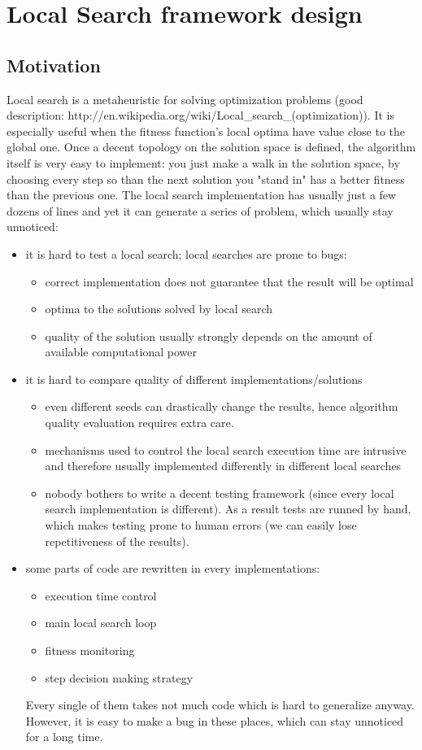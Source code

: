 \chapter{Local Search framework design}

\section{Motivation}

Local search is a metaheuristic for solving optimization problems (good description: http://en.wikipedia.org/wiki/Local\_search\_(optimization)).
It is especially useful when the fitness function's local optima have value close to the global one.
Once a decent topology on the solution space is defined, the algorithm itself is very easy to implement:
you just make a walk in the solution space, by choosing every step so than the next solution you "stand in" has
a better fitness than the previous one. The local search implementation has usually just a few dozens of lines and
yet it can generate a series of problem, which usually stay unnoticed:
\begin{itemize}
\item it is hard to test a local search; local searches are prone to bugs:
	\begin{itemize}
	\item correct implementation does not guarantee that the result will be optimal
	\item optima to the solutions solved by local search
	\item quality of the solution usually strongly depends on the amount of available computational power
	\end{itemize}
\item it is hard to compare quality of different implementations/solutions
	\begin{itemize}
	\item even different seeds can drastically change the results, hence algorithm quality evaluation requires extra care.
	\item mechanisms used to control the local search execution time are intrusive and therefore usually implemented differently in different local searches
	\item nobody bothers to write a decent testing framework (since every local search implementation is different).
		As a result tests are runned by hand, which makes testing prone to human errors (we can easily lose repetitiveness of the results).
	\end{itemize}
\item some parts of code are rewritten in every implementations:
	\begin{itemize}
	\item execution time control
	\item main local search loop
	\item fitness monitoring
	\item step decision making strategy
	\end{itemize}
	Every single of them takes not much code which is hard to generalize anyway.
	However, it is easy to make a bug in these places, which can stay unnoticed for a long time.
\end{itemize}

